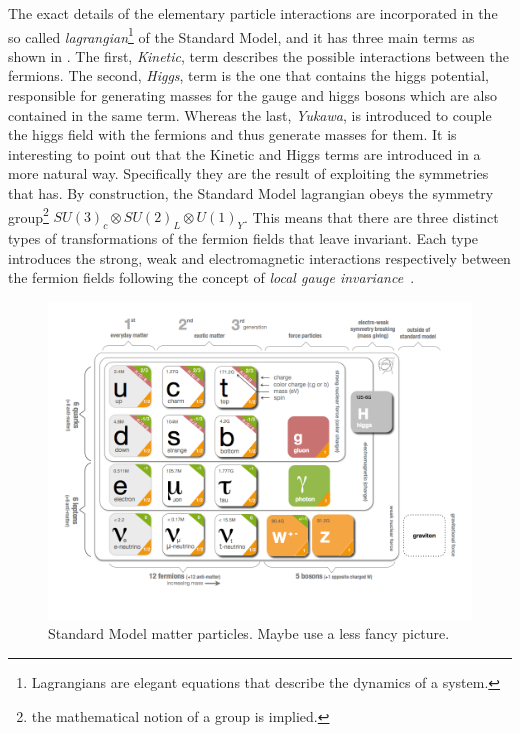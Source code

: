 The exact details of the elementary particle interactions are incorporated in the so called
{\it lagrangian}\footnote{ Lagrangians are elegant equations that describe the dynamics of a system.} of the Standard Model,
 and it has three main terms as shown in . The first, {\it Kinetic}, term describes the possible
interactions between the fermions. The second, {\it Higgs}, term is the one that contains the higgs potential, responsible for generating
masses for the gauge and higgs bosons which are also contained in the same term.
Whereas the last, {\it Yukawa}, is introduced to couple the higgs field with the fermions and thus generate masses for them.
It is interesting to point out that the Kinetic and Higgs terms are introduced in a more natural way.
Specifically they are the result of exploiting the symmetries that  has.
By construction, the Standard Model lagrangian obeys the symmetry group\footnote{the mathematical notion of a group is implied.}
$SU(3)_c\otimes SU(2)_L\otimes U(1)_Y$. This means that there are three distinct types of transformations of the fermion fields that leave 
invariant. Each type introduces the strong, weak and electromagnetic interactions respectively between the
fermion fields following the concept of {\it local gauge invariance}~\cite{aitchison}.

\begin{figure}[h]
  \begin{center}
    \includegraphics[trim=1.4cm 0cm 5.95cm 0cm, clip=true, width=\textwidth]{Figures/Chapter1/Standard_model_infographic.png}
    \caption{Standard Model matter particles. {\color{red} Maybe use a less fancy picture.}}
    \label{sm_particles}
  \end{center}
\end{figure}

